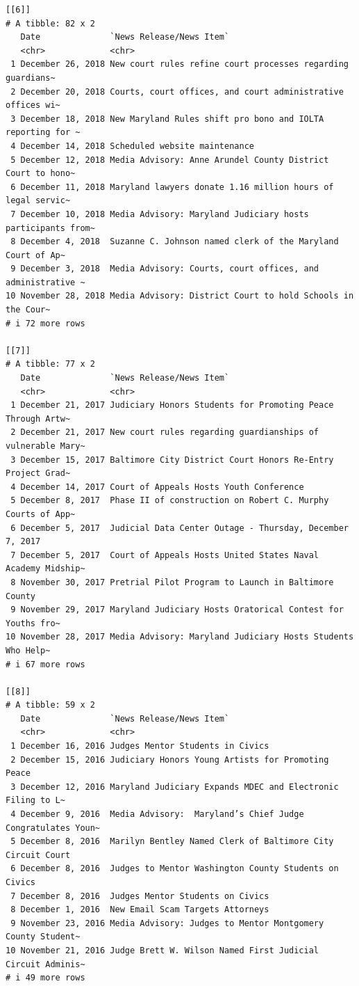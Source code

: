 \documentclass[
  letterpaper,
  DIV=11,
  numbers=noendperiod]{scrreprt}
\begin{document}
\begin{verbatim}
[[6]]
# A tibble: 82 x 2
   Date              `News Release/News Item`                                   
   <chr>             <chr>                                                      
 1 December 26, 2018 New court rules refine court processes regarding guardians~
 2 December 20, 2018 Courts, court offices, and court administrative offices wi~
 3 December 18, 2018 New Maryland Rules shift pro bono and IOLTA reporting for ~
 4 December 14, 2018 Scheduled website maintenance                              
 5 December 12, 2018 Media Advisory: Anne Arundel County District Court to hono~
 6 December 11, 2018 Maryland lawyers donate 1.16 million hours of legal servic~
 7 December 10, 2018 Media Advisory: Maryland Judiciary hosts participants from~
 8 December 4, 2018  Suzanne C. Johnson named clerk of the Maryland Court of Ap~
 9 December 3, 2018  Media Advisory: Courts, court offices, and administrative ~
10 November 28, 2018 Media Advisory: District Court to hold Schools in the Cour~
# i 72 more rows

[[7]]
# A tibble: 77 x 2
   Date              `News Release/News Item`                                   
   <chr>             <chr>                                                      
 1 December 21, 2017 Judiciary Honors Students for Promoting Peace Through Artw~
 2 December 21, 2017 New court rules regarding guardianships of vulnerable Mary~
 3 December 15, 2017 Baltimore City District Court Honors Re-Entry Project Grad~
 4 December 14, 2017 Court of Appeals Hosts Youth Conference                    
 5 December 8, 2017  Phase II of construction on Robert C. Murphy Courts of App~
 6 December 5, 2017  Judicial Data Center Outage - Thursday, December 7, 2017   
 7 December 5, 2017  Court of Appeals Hosts United States Naval Academy Midship~
 8 November 30, 2017 Pretrial Pilot Program to Launch in Baltimore County       
 9 November 29, 2017 Maryland Judiciary Hosts Oratorical Contest for Youths fro~
10 November 28, 2017 Media Advisory: Maryland Judiciary Hosts Students Who Help~
# i 67 more rows

[[8]]
# A tibble: 59 x 2
   Date              `News Release/News Item`                                   
   <chr>             <chr>                                                      
 1 December 16, 2016 Judges Mentor Students in Civics                           
 2 December 15, 2016 Judiciary Honors Young Artists for Promoting Peace         
 3 December 12, 2016 Maryland Judiciary Expands MDEC and Electronic Filing to L~
 4 December 9, 2016  Media Advisory:  Maryland’s Chief Judge Congratulates Youn~
 5 December 8, 2016  Marilyn Bentley Named Clerk of Baltimore City Circuit Court
 6 December 8, 2016  Judges to Mentor Washington County Students on Civics      
 7 December 8, 2016  Judges Mentor Students on Civics                           
 8 December 1, 2016  New Email Scam Targets Attorneys                           
 9 November 23, 2016 Media Advisory: Judges to Mentor Montgomery County Student~
10 November 21, 2016 Judge Brett W. Wilson Named First Judicial Circuit Adminis~
# i 49 more rows


\end{verbatim}
\end{document}
